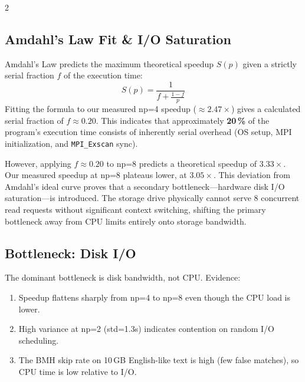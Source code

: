 \documentclass[11pt,a4paper]{article}
\begin{document}
\begin{multicols}{2}
\subsection{Amdahl's Law Fit \& I/O Saturation}

Amdahl's Law predicts the maximum theoretical speedup $S(p)$ given a strictly serial fraction $f$ of the execution time:
\[
  S(p) = \frac{1}{f + \frac{1-f}{p}}
\]
Fitting the formula to our measured np=4 speedup ($\approx2.47\times$) gives a calculated serial fraction of $f \approx 0.20$. This indicates that approximately \textbf{20\,\%} of the program's execution time consists of inherently serial overhead (OS setup, MPI initialization, and \texttt{MPI\_Exscan} sync).

However, applying $f \approx 0.20$ to np=8 predicts a theoretical speedup of $3.33\times$. Our measured speedup at np=8 plateaus lower, at $3.05\times$. This deviation from Amdahl's ideal curve proves that a secondary bottleneck---hardware disk I/O saturation---is introduced. The storage drive physically cannot serve 8 concurrent read requests without significant context switching, shifting the primary bottleneck away from CPU limits entirely onto storage bandwidth.

\begin{center}
\end{center}
\columnbreak

\subsection{Bottleneck: Disk I/O}

The dominant bottleneck is disk bandwidth, not CPU. Evidence:
\begin{enumerate}[nosep,leftmargin=*]
  \item Speedup flattens sharply from np=4 to np=8 even though the CPU load is lower.
  \item High variance at np=2 (std=1.3s) indicates contention on random I/O scheduling.
  \item The BMH skip rate on 10\,GB English-like text is high (few false matches), so CPU time is low relative to I/O.
\end{enumerate}


\end{multicols}
\end{document}
